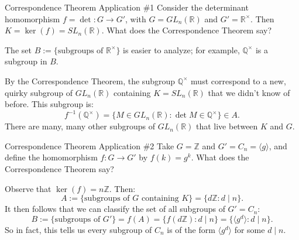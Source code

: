 \begin{problem}{Correspondence Theorem Application \#1}
    Consider the determinant homomorphism $f = \det: G \to G'$, with $G = GL_n(\mathbb{R})$ and $G' = \mathbb{R}^{\times}$.  Then $K = \ker(f) = SL_n(\mathbb{R})$.  What does the Correspondence Theorem say?
\end{problem}

\begin{solution}
    The set $B := \{\text{subgroups of } \mathbb{R}^{\times}\}$ is easier to analyze; for example, $\mathbb{Q}^{\times}$ is a subgroup in $B$.
    
    By the Correspondence Theorem, the subgroup $\mathbb{Q}^{\times}$ must correspond to a new, quirky subgroup of $GL_n(\mathbb{R})$ containing $K = SL_n(\mathbb{R})$ that we didn't know of before.  This subgroup is:
    \[ f^{-1}(\mathbb{Q}^{\times}) = \{M \in GL_n(\mathbb{R}): \det M \in \mathbb{Q}^{\times}\} \in A. \]
    There are many, many other subgroups of $GL_n(\mathbb{R})$ that live between $K$ and $G$.
\end{solution}

\begin{problem}{Correspondence Theorem Application \#2}
    Take $G = \mathbb{Z}$ and $G' = C_n = \langle g \rangle$, and define the homomorphism $f: G \to G'$ by $f(k) = g^k$.  What does the Correspondence Theorem say?
\end{problem}

\begin{solution}
    Observe that $\ker(f) = n \mathbb{Z}$.  Then:
    \[ A := \{\text{subgroups of } G \text{ containing } K\} = \{d\mathbb{Z} : d \mid n\}. \]
    It then follows that we can classify the set of all subgroups of $G' = C_n$:
    \[ B := \{ \text{subgroups of } G'\} = f(A) = \{f(d\mathbb{Z}) : d \mid n\} = \{ \langle g^d \rangle : d \mid n \}. \]
    So in fact, this tells us every subgroup of $C_n$ is of the form $\langle g^d \rangle$ for some $d \mid n$.
\end{solution}


